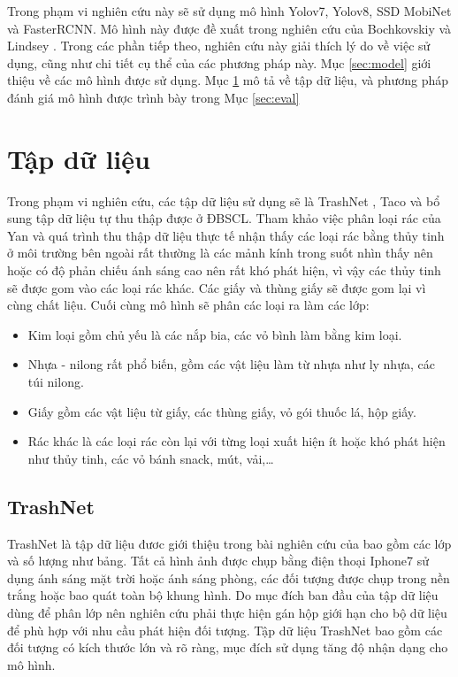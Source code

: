 \documentclass[../the.tex]{subfiles}
\begin{document}
Trong phạm vi nghiên cứu này sẽ sử dụng mô hình Yolov7, Yolov8, SSD MobiNet và FasterRCNN. Mô hình này được đề xuất trong nghiên cứu của Bochkovskiy \etal \cite{Bochkovskiy2020YOLOv4OS} và Lindsey \etal \cite{Lindsey1806905115}. Trong các phần tiếp theo, nghiên cứu này giải thích lý do về việc sử dụng, cũng như chi tiết cụ thể của các phương pháp này. Mục \ref{sec:model} giới thiệu về các mô hình được sử dụng. Mục \ref{sec:dataset} mô tả về tập dữ liệu, và phương pháp đánh giá mô hình được trình bày trong Mục \ref{sec:eval}

\section{Tập dữ liệu}
\label{sec:dataset}

{\fontsize{13}{12} \selectfont
Trong phạm vi nghiên cứu, các tập dữ liệu sử dụng sẽ là TrashNet \cite{yang2016classification}, Taco và bổ sung tập dữ liệu tự thu thập được ở ĐBSCL.
Tham khảo việc phân loại rác của Yan \cite{yang2016classification} và quá trình thu thập dữ liệu thực tế nhận thấy các loại rác bằng thủy tinh ở môi trường bên ngoài rất thường là các mảnh kính trong suốt nhìn thấy nên hoặc có độ phản chiếu ánh sáng cao nên rất khó phát hiện, vì vậy các thủy tinh sẽ được gom vào các loại rác khác.
Các giấy và thùng giấy sẽ được gom lại vì cùng chất liệu. Cuối cùng mô hình sẽ phân các loại ra làm các lớp:
\begin{itemize}
	\item Kim loại gồm chủ yếu là các nắp bia, các vỏ bình làm bằng kim loại.
	\item Nhựa - nilong rất phổ biến, gồm các vật liệu làm từ nhựa như ly nhựa, các túi nilong.
	\item Giấy gồm các vật liệu từ giấy, các thùng giấy, vỏ gói thuốc lá, hộp giấy.
	\item Rác khác là các loại rác còn lại với từng loại xuất hiện ít hoặc khó phát hiện như thủy tinh, các vỏ bánh snack,
	mút, vải,\dots
\end{itemize}

\subsection{TrashNet}
{\fontsize{13}{12} \selectfont 
TrashNet là tập dữ liệu đươc giới thiệu trong bài nghiên cứu của \cite{yang2016classification} bao gồm các lớp và số lượng như bảng. Tất cả hình ảnh được chụp bằng điện thoại Iphone7 sử dụng ánh sáng mặt trời hoặc ánh sáng phòng, các đối tượng được chụp trong nền trắng hoặc bao quát toàn bộ khung hình.
Do mục đích ban đầu của tập dữ liệu dùng để phân lớp nên nghiên cứu phải thực hiện gán hộp giới hạn cho bộ dữ liệu để phù hợp với nhu cầu phát hiện đối tượng. Tập dữ liệu TrashNet bao gồm các đối tượng có kích thước lớn và rõ ràng, mục đích sử dụng tăng độ nhận dạng cho mô hình.
}
}
\end{document}
